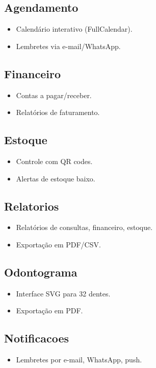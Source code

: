 \documentclass[a4paper,12pt]{article}
\begin{document}
\subsection{Agendamento}
\begin{itemize}
    \item Calendário interativo (FullCalendar).
    \item Lembretes via e-mail/WhatsApp.
\end{itemize}

\subsection{Financeiro}
\begin{itemize}
    \item Contas a pagar/receber.
    \item Relatórios de faturamento.
\end{itemize}

\subsection{Estoque}
\begin{itemize}
    \item Controle com QR codes.
    \item Alertas de estoque baixo.
\end{itemize}

\subsection{Relatorios}
\begin{itemize}
    \item Relatórios de consultas, financeiro, estoque.
    \item Exportação em PDF/CSV.
\end{itemize}

\subsection{Odontograma}
\begin{itemize}
    \item Interface SVG para 32 dentes.
    \item Exportação em PDF.
\end{itemize}

\subsection{Notificacoes}
\begin{itemize}
    \item Lembretes por e-mail, WhatsApp, push.
\end{itemize}
\end{document}
